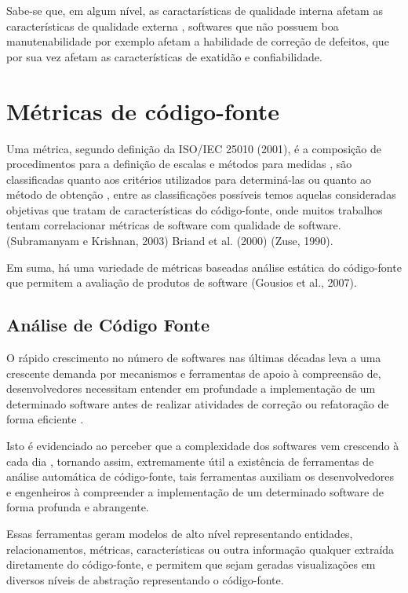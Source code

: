 \documentclass[qual, classic, a4paper]{ufbathesis}
\begin{document}
Sabe-se que, em algum nível, as caractarísticas de qualidade interna afetam as
características de qualidade externa \cite{McConnell2004}, softwares que não
possuem boa manutenabilidade por exemplo afetam a habilidade de correção de
defeitos, que por sua vez afetam as características de exatidão e
confiabilidade.

\section{Métricas de código-fonte}

Uma métrica, segundo definição da ISO/IEC 25010 (2001), é a composição de
procedimentos para a definição de escalas e métodos para medidas
\cite{Meirelles2013}, são classificadas quanto aos critérios utilizados para
determiná-las ou quanto ao método de obtenção \cite{Meirelles2013}, entre as
classificações possíveis temos aquelas consideradas objetivas que tratam de
características do código-fonte, onde muitos trabalhos tentam correlacionar
métricas de software com qualidade de software. (Subramanyam e Krishnan,
2003) Briand et al.  (2000) (Zuse, 1990).

Em suma, há uma variedade de métricas baseadas análise estática do código-fonte que permitem
a avaliação de produtos de software (Gousios et al., 2007).


\subsection{Análise de Código Fonte}

O rápido crescimento no número de softwares nas últimas décadas leva a uma
crescente demanda por mecanismos e ferramentas de apoio à compreensão de,
desenvolvedores necessitam entender em profundade a implementação de um
determinado software antes de realizar atividades de correção ou refatoração
de forma eficiente \cite{Kirkov2010}.

Isto é evidenciado ao perceber que a complexidade dos softwares vem crescendo
à cada dia \cite{Kirkov2010}, tornando assim, extremamente útil a existência
de ferramentas de análise automática de código-fonte, tais ferramentas
auxiliam os desenvolvedores e engenheiros à compreender a implementação de um
determinado software de forma profunda e abrangente.

Essas ferramentas geram modelos de alto nível representando entidades,
relacionamentos, métricas, características ou outra informação qualquer
extraída diretamente do código-fonte, e permitem que sejam geradas
visualizações em diversos níveis de abstração representando o código-fonte.
\end{document}
